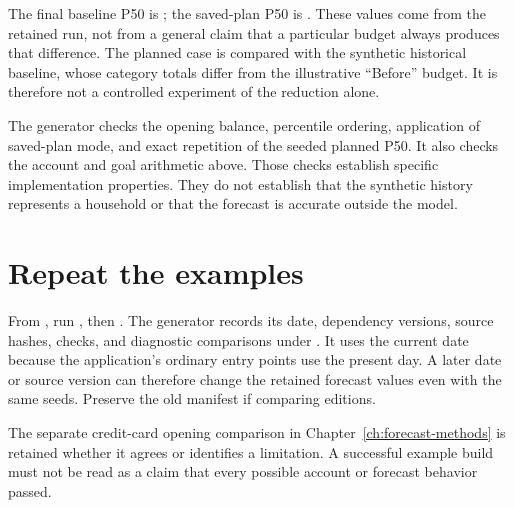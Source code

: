 The final baseline P50 is \money{\BaseFinal}; the saved-plan P50 is \money{\PlanFinal}. These values come from the retained run, not from a general claim that a particular budget always produces that difference. The planned case is compared with the synthetic historical baseline, whose category totals differ from the illustrative ``Before'' budget. It is therefore not a controlled experiment of the  reduction alone.

The generator checks the opening balance, percentile ordering, application of saved-plan mode, and exact repetition of the seeded planned P50. It also checks the account and goal arithmetic above. Those checks establish specific implementation properties. They do not establish that the synthetic history represents a household or that the forecast is accurate outside the model.

\section{Repeat the examples}
From , run , then . The generator records its date, dependency versions, source hashes, checks, and diagnostic comparisons under . It uses the current date because the application's ordinary entry points use the present day. A later date or source version can therefore change the retained forecast values even with the same seeds. Preserve the old manifest if comparing editions.

The separate credit-card opening comparison in Chapter~\ref{ch:forecast-methods} is retained whether it agrees or identifies a limitation. A successful example build must not be read as a claim that every possible account or forecast behavior passed.

